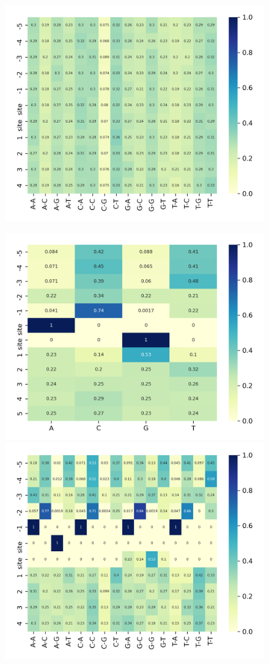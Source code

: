 \documentclass[journal,twoside]{IEEEtran}
\begin{document}
\begin{figure}[htbp]
{    \includegraphics[scale=0.6]{Pics/asheatmap_neg.png}}
\centerline{\includegraphics[scale=0.6]{Pics/ssheatmap_acceptor.png}
    \includegraphics[scale=0.6]{Pics/asheatmap_acceptor.png}}

\end{figure}
\end{document}
